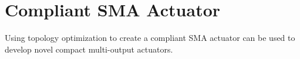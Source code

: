 \chapter{Compliant SMA Actuator}
Using topology optimization to create a compliant SMA actuator can be used to develop novel compact multi-output actuators.
